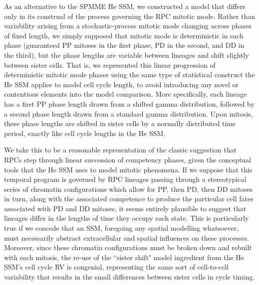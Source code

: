 \documentclass[10pt,letterpaper]{article}
\begin{document}
As an alternative to the SPMME He SSM, we constructed a model that differs only in its construal of the process governing the RPC mitotic mode. Rather than variability arising from a stochastic-process mitotic mode changing across phases of fixed length, we simply supposed that mitotic mode is deterministic in each phase (guaranteed PP mitoses in the first phase, PD in the second, and DD in the third), but the phase lengths are variable between lineages and shift slightly between sister cells. That is, we represented this linear progression of deterministic mitotic mode phases using the same type of statistical construct the He SSM applies to model cell cycle length, to avoid introducing any novel or contentious elements into the model comparison. More specifically, each lineage has a first PP phase length drawn from a shifted gamma distribution, followed by a second phase length drawn from a standard gamma distribution. Upon mitosis, these phase lengths are shifted in sister cells by a normally distributed time period, exactly like cell cycle lengths in the He SSM.

We take this to be a reasonable representation of the classic suggestion that RPCs step through linear succession of competency phases, given the conceptual tools that the He SSM uses to model mitotic phenomena. If we suppose that this temporal program is governed by RPC lineages passing through a stereotypical series of chromatin configurations which allow for PP, then PD, then DD mitoses in turn, along with the associated competence to produce the particular cell fates associated with PD and DD mitoses, it seems entirely plausible to suggest that lineages differ in the lengths of time they occupy each state. This is particularly true if we concede that an SSM, foregoing any spatial modelling whatsoever, must necessarily abstract extracellular and spatial influences on these processes. Moreover, since these chromatin configurations must be broken down and rebuilt with each mitosis, the re-use of the ``sister shift" model ingredient from the He SSM's cell cycle RV is congenial, representing the same sort of cell-to-cell variability that results in the small differences between sister cells in cycle timing. 
\end{document}
